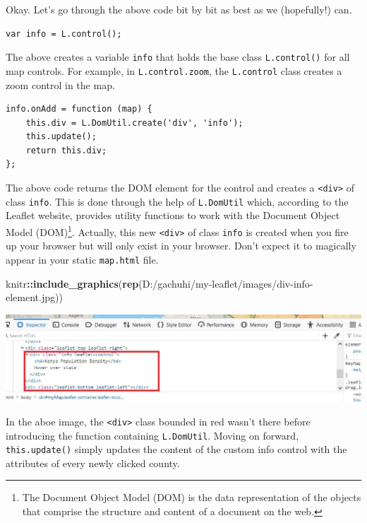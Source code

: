 \documentclass[
]{book}
\newenvironment{Shaded}{\begin{snugshade}}{\end{snugshade}}
\newcommand{\FunctionTok}[1]{\textcolor[rgb]{0.13,0.29,0.53}{\textbf{#1}}}
\newcommand{\NormalTok}[1]{#1}
\newcommand{\SpecialCharTok}[1]{\textcolor[rgb]{0.81,0.36,0.00}{\textbf{#1}}}
\newcommand{\StringTok}[1]{\textcolor[rgb]{0.31,0.60,0.02}{#1}}
\begin{document}
Okay. Let's go through the above code bit by bit as best as we (hopefully!) can.

\begin{verbatim}
var info = L.control();
\end{verbatim}

The above creates a variable \texttt{info} that holds the base class \texttt{L.control()} for all map controls. For example, in \texttt{L.control.zoom}, the \texttt{L.control} class creates a zoom control in the map.

\begin{verbatim}
info.onAdd = function (map) {
    this.div = L.DomUtil.create('div', 'info');
    this.update();
    return this.div;
};
\end{verbatim}

The above code returns the DOM element for the control and creates a \texttt{\textless{}div\textgreater{}} of class \texttt{info}. This is done through the help of \texttt{L.DomUtil} which, according to the Leaflet website, provides utility functions to work with the Document Object Model (DOM)\footnote{The Document Object Model (DOM) is the data representation of the objects that comprise the structure and content of a document on the web.}. Actually, this new \texttt{\textless{}div\textgreater{}} of class \texttt{info} is created when you fire up your browser but will only exist in your browser. Don't expect it to magically appear in your static \texttt{map.html} file.

\begin{Shaded}
\begin{Highlighting}[]
\NormalTok{knitr}\SpecialCharTok{::}\FunctionTok{include\_graphics}\NormalTok{(}\FunctionTok{rep}\NormalTok{(}\StringTok{\textquotesingle{}D:/gachuhi/my{-}leaflet/images/div{-}info{-}element.jpg\textquotesingle{}}\NormalTok{))}
\end{Highlighting}
\end{Shaded}

\includegraphics{../images/div-info-element.jpg}

In the aboe image, the \texttt{\textless{}div\textgreater{}} class bounded in red wasn't there before introducing the function containing \texttt{L.DomUtil}. Moving on forward, \texttt{this.update()} simply updates the content of the custom info control with the attributes of every newly clicked county.
\end{document}
